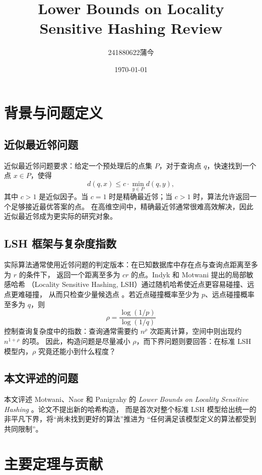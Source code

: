 \documentclass[UTF8,11pt,a4paper]{ctexart}
\title{\Huge\textbf{Lower Bounds on Locality Sensitive Hashing Review}\\[0.5em]}
\author{241880622\quad 蒲今}
\date{\today}
\begin{document}
\maketitle

\vspace{-1.2em}
\begingroup
\small
\setlength{\parskip}{0pt}
\tableofcontents
\endgroup
\newpage

\section{背景与问题定义}

\subsection{近似最近邻问题}

近似最近邻问题要求：给定一个预处理后的点集 $P$，对于查询点 $q$，快速找到一个点
$x\in P$，使得
\[
  d(q,x)\le c\cdot \min_{y\in P} d(q,y),
\]
其中 $c>1$ 是近似因子。当 $c=1$ 时是精确最近邻；当 $c>1$ 时，算法允许返回一个足够接近最优答案的点。
在高维空间中，精确最近邻通常很难高效解决，因此近似最近邻成为更实际的研究对象。

\subsection{LSH 框架与复杂度指数}

实际算法通常使用近邻问题的判定版本：在已知数据库中存在点与查询点距离至多为 $r$ 的条件下，
返回一个距离至多为 $cr$ 的点。Indyk 和 Motwani 提出的局部敏感哈希
（Locality Sensitive Hashing, LSH）通过随机哈希使近点更容易碰撞、远点更难碰撞，
从而只检查少量候选点 \cite{im1998}。若近点碰撞概率至少为 $p$、远点碰撞概率至多为 $q$，则
\[
  \rho=\frac{\log(1/p)}{\log(1/q)}
\]
控制查询复杂度中的指数：查询通常需要约 $n^\rho$ 次距离计算，空间中则出现约 $n^{1+\rho}$ 的项。
因此，构造问题是尽量减小 $\rho$，而下界问题则要回答：在标准 LSH 模型内，$\rho$ 究竟还能小到什么程度？

\subsection{本文评述的问题}

本文评述 Motwani、Naor 和 Panigrahy 的
\emph{Lower Bounds on Locality Sensitive Hashing} \cite{mnp2006}。论文不提出新的哈希构造，
而是首次对整个标准 LSH 模型给出统一的非平凡下界，将“尚未找到更好的算法”推进为
“任何满足该模型定义的算法都受到共同限制”。

\section{主要定理与贡献}
\end{document}
